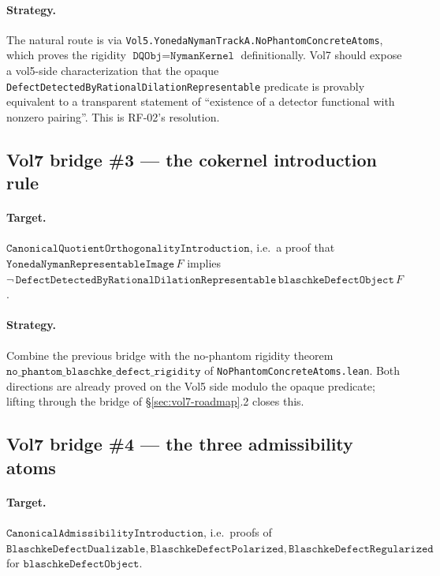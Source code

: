 \documentclass[11pt]{article}
\theoremstyle{plain}
\theoremstyle{definition}
\theoremstyle{remark}
\newcommand{\code}[1]{\texttt{#1}}
\begin{document}
\paragraph{Strategy.}
The natural route is via \code{Vol5.YonedaNymanTrackA.NoPhantomConcreteAtoms},
which proves the rigidity \(\code{DQObj} = \code{NymanKernel}\)
definitionally.  Vol7 should expose a vol5-side characterization
that the opaque \code{DefectDetectedByRationalDilationRepresentable}
predicate is provably equivalent to a transparent statement of
``existence of a detector functional with nonzero pairing''.  This
is RF-02's resolution.

\subsection{Vol7 bridge \#3 --- the cokernel introduction rule}

\paragraph{Target.}
\(\code{CanonicalQuotientOrthogonalityIntroduction}\), i.e.\ a proof
that \(\code{YonedaNymanRepresentableImage}\,F\) implies
\(\neg\,\code{DefectDetectedByRationalDilationRepresentable}\,
   \code{blaschkeDefectObject}\,F\).

\paragraph{Strategy.}
Combine the previous bridge with the no-phantom rigidity theorem
\(\code{no\_phantom\_blaschke\_defect\_rigidity}\) of
\code{NoPhantomConcreteAtoms.lean}.  Both directions are already
proved on the Vol5 side modulo the opaque predicate; lifting
through the bridge of \S\ref{sec:vol7-roadmap}.2 closes this.

\subsection{Vol7 bridge \#4 --- the three admissibility atoms}

\paragraph{Target.}
\(\code{CanonicalAdmissibilityIntroduction}\), i.e.\ proofs of
\(\code{BlaschkeDefectDualizable},
  \code{BlaschkeDefectPolarized},
  \code{BlaschkeDefectRegularized}\) for
\(\code{blaschkeDefectObject}\).
\end{document}
